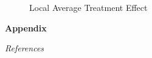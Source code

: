 \begin{frame}
\begin{figure}\caption{Local Average Treatment Effect}
\end{figure}
\end{frame}

\beginbackup\appendix
\begin{frame}\begin{center}
\LARGE\textbf{Appendix}
\end{center}\end{frame}

\begin{frame}\begin{center}
\LARGE\textit{References}
\end{center}\end{frame}
\begin{frame}[allowframebreaks]\frametitle{}

\nocite{Carneiro.2011, Heckman.1990c, Heckman.2010h}





\end{frame}

\backupend

